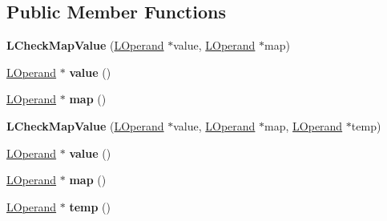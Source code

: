 \subsection*{Public Member Functions}
\begin{DoxyCompactItemize}
\item 
{\bfseries L\+Check\+Map\+Value} (\hyperlink{classv8_1_1internal_1_1_l_operand}{L\+Operand} $\ast$value, \hyperlink{classv8_1_1internal_1_1_l_operand}{L\+Operand} $\ast$map)\hypertarget{classv8_1_1internal_1_1_l_check_map_value_a84a82dc3df6089aadcfdc4bd3f98129d}{}\label{classv8_1_1internal_1_1_l_check_map_value_a84a82dc3df6089aadcfdc4bd3f98129d}

\item 
\hyperlink{classv8_1_1internal_1_1_l_operand}{L\+Operand} $\ast$ {\bfseries value} ()\hypertarget{classv8_1_1internal_1_1_l_check_map_value_a3d2db9e1edcc34924e2f372b445098e2}{}\label{classv8_1_1internal_1_1_l_check_map_value_a3d2db9e1edcc34924e2f372b445098e2}

\item 
\hyperlink{classv8_1_1internal_1_1_l_operand}{L\+Operand} $\ast$ {\bfseries map} ()\hypertarget{classv8_1_1internal_1_1_l_check_map_value_a518554e3e78db673b24af0d41575c5c1}{}\label{classv8_1_1internal_1_1_l_check_map_value_a518554e3e78db673b24af0d41575c5c1}

\item 
{\bfseries L\+Check\+Map\+Value} (\hyperlink{classv8_1_1internal_1_1_l_operand}{L\+Operand} $\ast$value, \hyperlink{classv8_1_1internal_1_1_l_operand}{L\+Operand} $\ast$map, \hyperlink{classv8_1_1internal_1_1_l_operand}{L\+Operand} $\ast$temp)\hypertarget{classv8_1_1internal_1_1_l_check_map_value_ab3c42813df10854ff80dbc2ea518ffc6}{}\label{classv8_1_1internal_1_1_l_check_map_value_ab3c42813df10854ff80dbc2ea518ffc6}

\item 
\hyperlink{classv8_1_1internal_1_1_l_operand}{L\+Operand} $\ast$ {\bfseries value} ()\hypertarget{classv8_1_1internal_1_1_l_check_map_value_a3d2db9e1edcc34924e2f372b445098e2}{}\label{classv8_1_1internal_1_1_l_check_map_value_a3d2db9e1edcc34924e2f372b445098e2}

\item 
\hyperlink{classv8_1_1internal_1_1_l_operand}{L\+Operand} $\ast$ {\bfseries map} ()\hypertarget{classv8_1_1internal_1_1_l_check_map_value_a518554e3e78db673b24af0d41575c5c1}{}\label{classv8_1_1internal_1_1_l_check_map_value_a518554e3e78db673b24af0d41575c5c1}

\item 
\hyperlink{classv8_1_1internal_1_1_l_operand}{L\+Operand} $\ast$ {\bfseries temp} ()\hypertarget{classv8_1_1internal_1_1_l_check_map_value_a21a5840b06b8bdcd12d454b0491db356}{}\label{classv8_1_1internal_1_1_l_check_map_value_a21a5840b06b8bdcd12d454b0491db356}


\end{DoxyCompactItemize}
